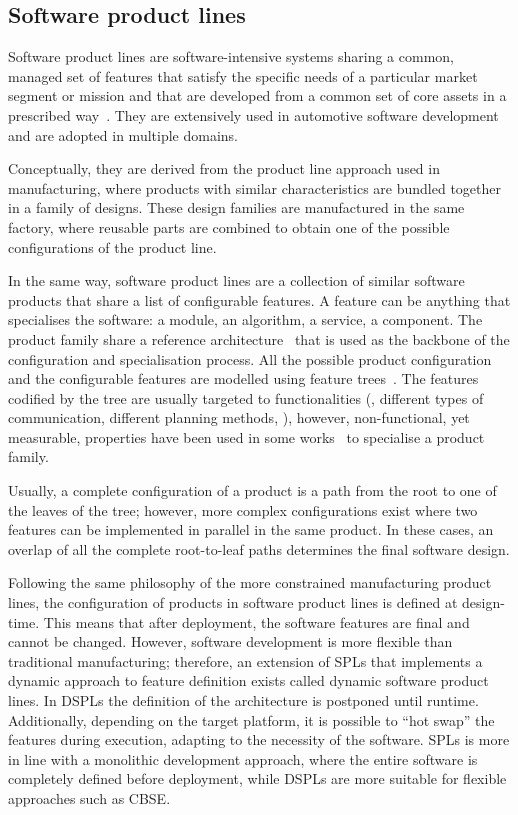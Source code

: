 \subsection{Software product lines}
Software product lines are software-intensive systems sharing a common, managed set of features that satisfy the specific needs of a particular market segment or mission and that are developed from a common set of core assets in a prescribed way~\cite{northrop2002sei}. They are extensively used in automotive software development and are adopted in multiple domains.

Conceptually, they are derived from the product line approach used in manufacturing, where products with similar characteristics are bundled together in a family of designs. These design families are manufactured in the same factory, where reusable parts are combined to obtain one of the possible configurations of the product line.

In the same way, software product lines are a collection of similar software products that share a list of configurable features. A feature can be anything that specialises the software: a module, an algorithm, a service, a component. The product family share a reference architecture~\cite{nakagawa2011reference} that is used as the backbone of the configuration and specialisation process. All the possible product configuration and the configurable features are modelled using feature trees~\cite{mendonca2009splot, eriksson2009managing}. The features codified by the tree are usually targeted to functionalities (\eg, different types of communication, different planning methods, \etc), however, non-functional, yet measurable, properties have been used in some works~\cite{benavides2005automated} to specialise a product family.

Usually, a complete configuration of a product is a path from the root to one of the leaves of the tree; however, more complex configurations exist where two features can be implemented in parallel in the same product. In these cases, an overlap of all the complete root-to-leaf paths determines the final software design.

Following the same philosophy of the more constrained manufacturing product lines, the configuration of products in software product lines is defined at design-time. This means that after deployment, the software features are final and cannot be changed. However, software development is more flexible than traditional manufacturing; therefore, an extension of SPLs that implements a dynamic approach to feature definition exists called dynamic software product lines. In DSPLs the definition of the architecture is postponed until runtime. Additionally, depending on the target platform, it is possible to ``hot swap'' the features during execution, adapting to the necessity of the software. SPLs is more in line with a monolithic development approach, where the entire software is completely defined before deployment, while DSPLs are more suitable for flexible approaches such as CBSE.

